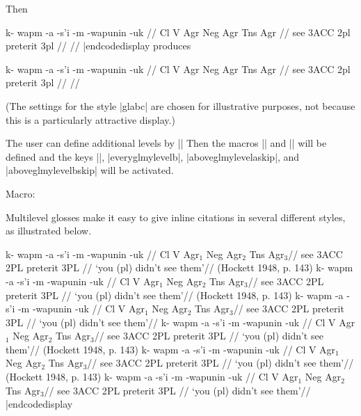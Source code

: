 Then

\codedisplay
\ex[lingstyle=glabc]
\begingl
\gla k- wapm -a -s'i -m -wapunin -uk //
\glb Cl V Agr Neg Agr Tns Agr //
 see {3\sc ACC} {} 2pl preterit 3pl //
//
\endgl
\xe
|endcodedisplay
produces


\framedisplay
\ex[lingstyle=glabc]
\begingl
\gla k- wapm -a -s'i -m -wapunin -uk //
\glb Cl V Agr Neg Agr Tns Agr //
 see {3\sc ACC} {} 2pl preterit 3pl //
//
\endgl
\xe
\endframedisplay

\noindent (The settings for the style |glabc| are chosen for
illustrative purposes, not because this is a particularly
attractive display.)

The user can define additional levels by
\medskip
||
\medskip
Then the macros |\glmylevela| and |\glmylevelb| will be defined
and the keys |\everyglmylevela|, |everyglmylevelb|,
|aboveglmylevelaskip|, and |aboveglmylevelbskip| will be
activated.



\medskip
\vfil\break
{}\medskip

\noindent Macro:\quad \idx{|\rightcite|}
\medskip


\noindent Multilevel glosses make it easy to give inline citations in
several different styles, as illustrated below.

\framedisplay
\pex[glstyle=multilevel,everygla=,everyglb=,everyglc=,
   aboveglaskip=0pt,aboveglbskip=0pt,aboveglftskip=1ex]
\a \begingl
\gla k- wapm -a -s'i -m -wapunin -uk //
\glb Cl V Agr$_1$ Neg Agr$_2$ Tns Agr$_3$//
 see {3\sc ACC} {} 2{\sc PL} preterit 3{\sc PL} //
\glft `you (pl) didn't see them'//
\endgl
\hfill (Hockett 1948, p. 143)
\a \begingl
\gla k- wapm -a -s'i -m -wapunin -uk //
\glb Cl V Agr$_1$ Neg Agr$_2$ Tns Agr$_3$//
 see {3\sc ACC} {} 2{\sc PL} preterit 3{\sc PL} //
\glft `you (pl) didn't see them'//
\endgl
\hfil (Hockett 1948, p. 143)
\a \begingl
\gla k- wapm -a -s'i -m -wapunin -uk //
\glb Cl V Agr$_1$ Neg Agr$_2$ Tns Agr$_3$//
 see {3\sc ACC} {} 2{\sc PL} preterit 3{\sc PL} //
\glft {}
   `you (pl) didn't see them'//
\endgl
\xe
\endframedisplay
\codedisplay
\pex[glstyle=multilevel,everygla=,everyglb=,everyglc=,
   aboveglaskip=0pt,aboveglbskip=0pt,aboveglftskip=1ex]
\a \begingl
\gla k- wapm -a -s'i -m -wapunin -uk //
\glb Cl V Agr$_1$ Neg Agr$_2$ Tns Agr$_3$//
 see {3\sc ACC} {} 2{\sc PL} preterit 3{\sc PL} //
\glft `you (pl) didn't see them'//
\endgl \hfill (Hockett 1948, p. 143)
\a \begingl
\gla k- wapm -a -s'i -m -wapunin -uk //
\glb Cl V Agr$_1$ Neg Agr$_2$ Tns Agr$_3$//
 see {3\sc ACC} {} 2{\sc PL} preterit 3{\sc PL} //
\glft `you (pl) didn't see them'//
\endgl \hfil (Hockett 1948, p. 143)
\a \begingl
\gla k- wapm -a -s'i -m -wapunin -uk //
\glb Cl V Agr$_1$ Neg Agr$_2$ Tns Agr$_3$//
 see {3\sc ACC} {} 2{\sc PL} preterit 3{\sc PL} //
\glft {}
   `you (pl) didn't see them'//
\endgl
\xe
|endcodedisplay



